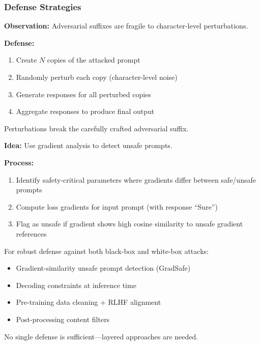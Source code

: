 \bigseparator

\subsubsection{Defense Strategies}

\begin{defbox}[SmoothLLM]
\textbf{Observation:} Adversarial suffixes are fragile to character-level perturbations.

\textbf{Defense:}
\begin{enumerate}
  \item Create $N$ copies of the attacked prompt
  \item Randomly perturb each copy (character-level noise)
  \item Generate responses for all perturbed copies
  \item Aggregate responses to produce final output
\end{enumerate}

Perturbations break the carefully crafted adversarial suffix.
\end{defbox}

\begin{defbox}[GradSafe]
\textbf{Idea:} Use gradient analysis to detect unsafe prompts.

\textbf{Process:}
\begin{enumerate}
  \item Identify safety-critical parameters where gradients differ between safe/unsafe prompts
  \item Compute loss gradients for input prompt (with response ``Sure'')
  \item Flag as unsafe if gradient shows high cosine similarity to unsafe gradient references
\end{enumerate}
\end{defbox}

\begin{tipbox}
For robust defense against both black-box and white-box attacks:
\begin{itemize}
  \item Gradient-similarity unsafe prompt detection (GradSafe)
  \item Decoding constraints at inference time
  \item Pre-training data cleaning + RLHF alignment
  \item Post-processing content filters
\end{itemize}

No single defense is sufficient---layered approaches are needed.
\end{tipbox}

